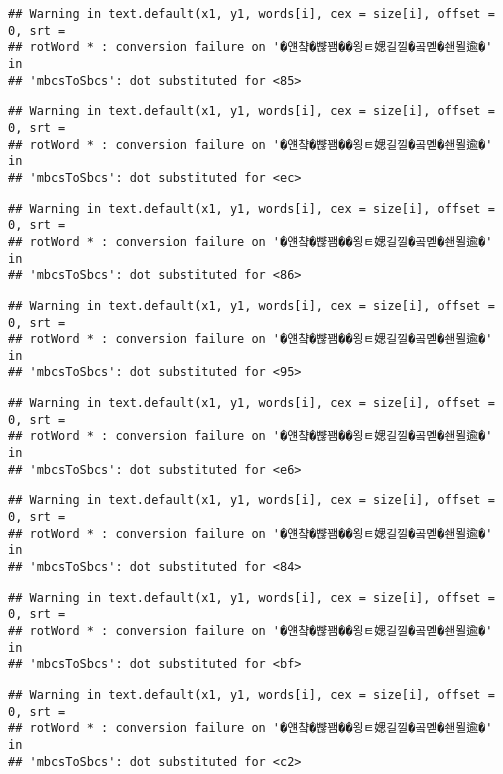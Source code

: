 \documentclass[]{article}
\begin{document}
\begin{verbatim}
## Warning in text.default(x1, y1, words[i], cex = size[i], offset = 0, srt =
## rotWord * : conversion failure on '�얜챸�뺞꽴��욍ㅌ媤길낄�곸몓�쇈묄逾�' in
## 'mbcsToSbcs': dot substituted for <85>
\end{verbatim}

\begin{verbatim}
## Warning in text.default(x1, y1, words[i], cex = size[i], offset = 0, srt =
## rotWord * : conversion failure on '�얜챸�뺞꽴��욍ㅌ媤길낄�곸몓�쇈묄逾�' in
## 'mbcsToSbcs': dot substituted for <ec>
\end{verbatim}

\begin{verbatim}
## Warning in text.default(x1, y1, words[i], cex = size[i], offset = 0, srt =
## rotWord * : conversion failure on '�얜챸�뺞꽴��욍ㅌ媤길낄�곸몓�쇈묄逾�' in
## 'mbcsToSbcs': dot substituted for <86>
\end{verbatim}

\begin{verbatim}
## Warning in text.default(x1, y1, words[i], cex = size[i], offset = 0, srt =
## rotWord * : conversion failure on '�얜챸�뺞꽴��욍ㅌ媤길낄�곸몓�쇈묄逾�' in
## 'mbcsToSbcs': dot substituted for <95>
\end{verbatim}

\begin{verbatim}
## Warning in text.default(x1, y1, words[i], cex = size[i], offset = 0, srt =
## rotWord * : conversion failure on '�얜챸�뺞꽴��욍ㅌ媤길낄�곸몓�쇈묄逾�' in
## 'mbcsToSbcs': dot substituted for <e6>
\end{verbatim}

\begin{verbatim}
## Warning in text.default(x1, y1, words[i], cex = size[i], offset = 0, srt =
## rotWord * : conversion failure on '�얜챸�뺞꽴��욍ㅌ媤길낄�곸몓�쇈묄逾�' in
## 'mbcsToSbcs': dot substituted for <84>
\end{verbatim}

\begin{verbatim}
## Warning in text.default(x1, y1, words[i], cex = size[i], offset = 0, srt =
## rotWord * : conversion failure on '�얜챸�뺞꽴��욍ㅌ媤길낄�곸몓�쇈묄逾�' in
## 'mbcsToSbcs': dot substituted for <bf>
\end{verbatim}

\begin{verbatim}
## Warning in text.default(x1, y1, words[i], cex = size[i], offset = 0, srt =
## rotWord * : conversion failure on '�얜챸�뺞꽴��욍ㅌ媤길낄�곸몓�쇈묄逾�' in
## 'mbcsToSbcs': dot substituted for <c2>
\end{verbatim}
\end{document}
